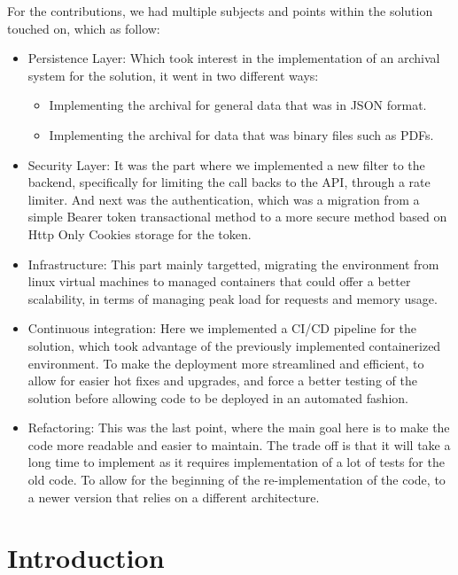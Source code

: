 For the contributions, we had multiple subjects and points within the solution touched on,
which as follow:
\begin{itemize}
    \item Persistence Layer: Which took interest in the implementation of an archival 
        system for the solution, it went in two different ways:
        \begin{itemize}
            \item Implementing the archival for general data that was in JSON format.
            \item Implementing the archival for data that was binary files such as PDFs.
        \end{itemize}
    \item Security Layer: It was the part where we implemented a new filter to the backend,
        specifically for limiting the call backs to the API, through a rate limiter.
        And next was the authentication, which was a migration from a simple Bearer token
        transactional method to a more secure method based on Http Only Cookies storage for
        the token.
    \item Infrastructure: This part mainly targetted, migrating the environment from linux
        virtual machines to managed containers that could offer a better scalability,
        in terms of managing peak load for requests and memory usage.
    \item Continuous integration: Here we implemented a CI/CD pipeline for the solution,
        which took advantage of the previously implemented containerized environment.
        To make the deployment more streamlined and efficient, to allow for easier hot
        fixes and upgrades, and force a better testing of the solution before allowing 
        code to be deployed in an automated fashion.
    \item Refactoring: This was the last point, where the main goal here is to make
        the code more readable and easier to maintain. The trade off is that it will
        take a long time to implement as it requires implementation of a lot of tests
        for the old code. To allow for the beginning of the re-implementation of the
        code, to a newer version that relies on a different architecture.
\end{itemize}

\newpage

\section{Introduction}

